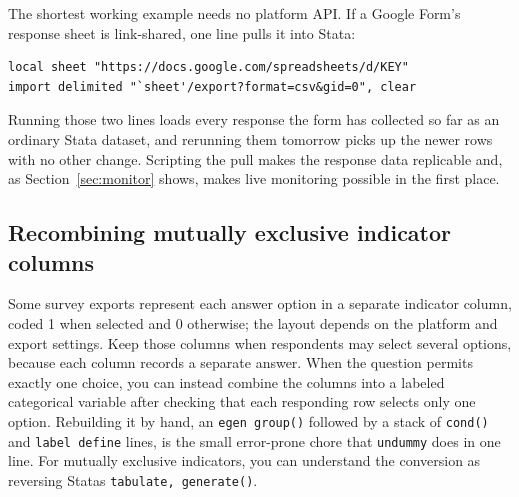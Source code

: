 \documentclass[
    a4paper,
    fontsize=10pt,
    twoside=true,
    numbers=noenddot,
]{kaobook}
\begin{document}
The shortest working example needs no platform API. If a Google Form's response sheet is link-shared, one line pulls it into Stata:
\par
{\footnotesize
\begin{verbatim}
local sheet "https://docs.google.com/spreadsheets/d/KEY"
import delimited "`sheet'/export?format=csv&gid=0", clear
\end{verbatim}
}
Running those two lines loads every response the form has collected so far as an ordinary Stata dataset, and rerunning them tomorrow picks up the newer rows with no other change. Scripting the pull makes the response data replicable and, as Section~\ref{sec:monitor} shows, makes live monitoring possible in the first place.

\subsection{Recombining mutually exclusive indicator columns}
Some survey exports represent each answer option in a separate indicator column, coded 1 when selected and 0 otherwise; the layout depends on the platform and export settings. Keep those columns when respondents may select several options, because each column records a separate answer. When the question permits exactly one choice, you can instead combine the columns into a labeled categorical variable after checking that each responding row selects only one option. Rebuilding it by hand, an \texttt{egen group()} followed by a stack of \texttt{cond()} and \texttt{label define} lines, is the small error-prone chore that \texttt{undummy} does in one line. For mutually exclusive indicators, you can understand the conversion as reversing Stata\textquotesingle s \texttt{tabulate, generate()}.
\end{document}
